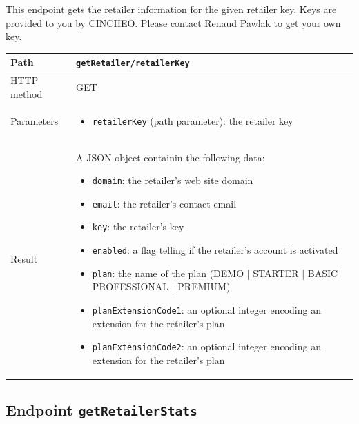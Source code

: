 \documentclass[a4paper]{report}
\begin{document}
This endpoint gets the retailer information for the given retailer key. Keys are provided to you by CINCHEO. Please contact Renaud Pawlak to get your own key.

\begin{center}
\begin{tabularx} {\textwidth} { | l | X | }

\hline

Path & \texttt{getRetailer/retailerKey} \\

\hline

HTTP method & GET \\

\hline

Parameters & \begin{itemize}[leftmargin=*,noitemsep,topsep=0px]
\item \texttt{retailerKey} (path parameter): the retailer key
\end{itemize} \\

\hline

Result & A JSON object containin the following data: \begin{itemize}[leftmargin=*,noitemsep,topsep=0px]
\item \texttt{domain}: the retailer's web site domain
\item \texttt{email}: the retailer's contact email
\item \texttt{key}: the retailer's key
\item \texttt{enabled}: a flag telling if the retailer's account is activated
\item \texttt{plan}: the name of the plan (DEMO | STARTER | BASIC | PROFESSIONAL | PREMIUM)
\item \texttt{planExtensionCode1}: an optional integer encoding an extension for the retailer's plan
\item \texttt{planExtensionCode2}: an optional integer encoding an extension for the retailer's plan
\end{itemize} \\

\hline

\end{tabularx}
\end{center}

\subsection{Endpoint \texttt{getRetailerStats}}
\end{document}
